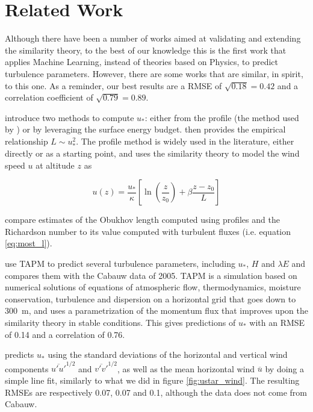 \documentclass[a4paper,11pt]{kth-mag}
\begin{document}
\section{Related Work}
\label{sec:related_work}
Although there have been a number of works aimed at validating \citep{Businger1971,basicatm,Dyer1974,windprof_nosqr} and extending \citep{sheba_phim,most_teal,Wilson2008,aerodynamic_fluxes} the similarity theory, to the best of our knowledge this is the first work that applies Machine Learning, instead of theories based on Physics, to predict turbulence parameters. However, there are some works that are similar, in spirit, to this one. As a reminder, our best results are a RMSE of $\sqrt{0.18}=0.42$ and a correlation coefficient of $\sqrt{0.79}=0.89$.


\cite{VanUlden1985} introduce two methods to compute $u_*$: either from the profile (the method used by \cite{ustar_from_profile}) or by leveraging the surface energy budget. \cite{Venkatram1980} then provides the empirical relationship $L\sim u_*^2$. The profile method is widely used in the literature, either directly or as a starting point, and uses the similarity theory to model the wind speed $u$ at altitude $z$ as

\begin{equation}
\label{eq:profile_method}
u(z)=\frac{u_*}{\kappa}\left[\ln\left(\frac{z}{z_0}\right)+\beta\frac{z-z_0}{L}\right]
\end{equation}

\cite{Irwin1981} compare estimates of the Obukhov length computed using profiles and the Richardson number to its value computed with turbulent fluxes (i.e. equation \ref{eq:most_l}).

\cite{cabauw_preds} use TAPM to predict several turbulence parameters, including $u_*$, $H$ and $\lambda E$ and compares them with the Cabauw data of 2005. TAPM is a simulation based on numerical solutions of equations of atmospheric flow, thermodynamics, moisture conservation, turbulence and dispersion on a horizontal grid that goes down to \SI{300}{\meter}, and uses a parametrization of the momentum flux that improves upon the similarity theory in stable conditions. This gives predictions of $u_*$ with an RMSE of 0.14 and a correlation of 0.76.

\cite{weber1999} predicts $u_*$ using the standard deviations of the  horizontal and vertical wind components $\overline{u'u'}^{1/2}$ and $\overline{v'v'}^{1/2}$, as well as the mean horizontal wind $\overline{u}$ by doing a simple line fit, similarly to what we did in figure \ref{fig:ustar_wind}. The resulting RMSEs are respectively 0.07, 0.07 and 0.1, although the data does not come from Cabauw.
\end{document}
